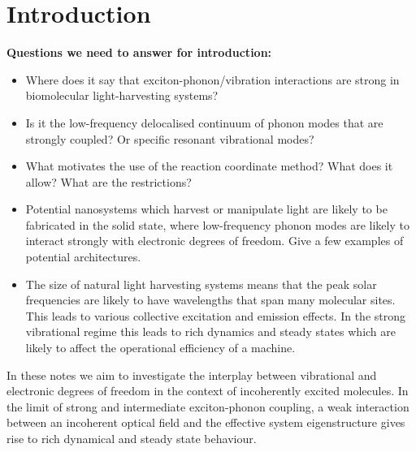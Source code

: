 \documentclass[]{article}
\begin{document}
\section{Introduction}
\textbf{Questions we need to answer for introduction:}
\begin{itemize}
	\item Where does it say that exciton-phonon/vibration interactions are strong in biomolecular light-harvesting systems?
	\item Is it the low-frequency delocalised continuum of phonon modes that are strongly coupled? Or specific resonant vibrational modes?
	\item What motivates the use of the reaction coordinate method? What does it allow? What are the restrictions?
	\item Potential nanosystems which harvest or manipulate light are likely to be fabricated in the solid state, where low-frequency phonon modes are likely to interact strongly with electronic degrees of freedom. Give a few examples of potential architectures.
	\item The size of natural light harvesting systems means that the peak solar frequencies are likely to have wavelengths that span many molecular sites. This leads to various collective excitation and emission effects. In the strong vibrational regime this leads to rich dynamics and steady states which are likely to affect the operational efficiency of a machine.
\end{itemize}
In these notes we aim to investigate the interplay between vibrational and electronic degrees of freedom in the context of incoherently excited molecules. In the limit of strong and intermediate exciton-phonon coupling, a weak interaction between an incoherent optical field and the effective system eigenstructure gives rise to rich dynamical and steady state behaviour. 
\end{document}
